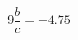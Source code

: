 \documentclass[preview]{standalone}
\begin{document}
\begin{align*}
9 \dfrac{b}{c} = -4.75
\end{align*}
\end{document}
